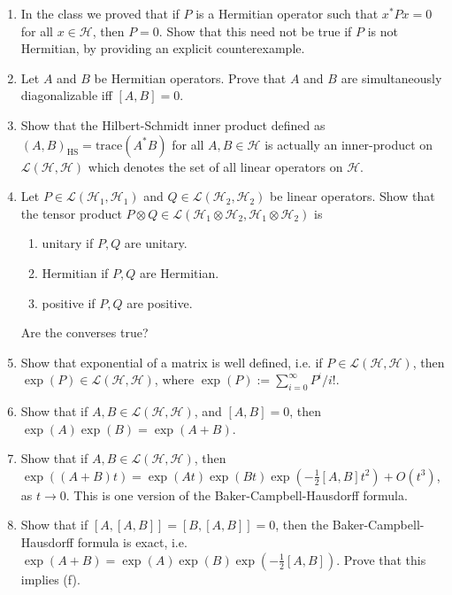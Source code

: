 \documentclass[10pt]{article}
\newcounter{ex}
\theoremstyle{plain}
\theoremstyle{definition}
\begin{document}
\begin{enumerate}[label=(\alph*)]

\item In the class we proved that if $P$ is a Hermitian operator such that $x^{\ast} P x = 0$ for all $x \in \mathcal{H}$, then $P = 0$. Show that this need not be true if $P$ is not Hermitian, by providing an explicit counterexample.

\item Let $A$ and $B$ be Hermitian operators. Prove that $A$ and $B$ are simultaneously diagonalizable iff $[A,B] = 0$.

\item Show that the Hilbert-Schmidt inner product defined as $(A,B)_{\text{HS}} = \text{trace}(A^{\ast}B)$ for all $A,B \in \mathcal{H}$ is actually an inner-product on $\mathcal{L}(\mathcal{H}, \mathcal{H})$ which denotes the set of all linear operators on $\mathcal{H}$.

\item Let $P \in \mathcal{L}(\mathcal{H}_1, \mathcal{H}_1)$ and $Q \in \mathcal{L}(\mathcal{H}_2, \mathcal{H}_2)$ be linear operators. Show that the tensor product $P \otimes Q \in \mathcal{L}(\mathcal{H}_1 \otimes \mathcal{H}_2, \mathcal{H}_1 \otimes \mathcal{H}_2)$ is
\begin{enumerate}[label=(\roman*)]
\item unitary if $P,Q$ are unitary.
\item Hermitian if $P,Q$ are Hermitian.
\item positive if $P,Q$ are positive.
\end{enumerate}
Are the converses true?

\item Show that exponential of a matrix is well defined, i.e. if $P \in \mathcal{L}(\mathcal{H}, \mathcal{H})$, then $\exp(P) \in \mathcal{L}(\mathcal{H}, \mathcal{H})$, where $\exp(P) := \sum\limits_{i=0}^{\infty} P^i / i !$.

\item Show that if $A,B \in \mathcal{L}(\mathcal{H}, \mathcal{H})$, and $[A,B] = 0$, then $\exp(A) \exp(B) = \exp(A+B)$.

\item Show that if $A,B \in \mathcal{L}(\mathcal{H}, \mathcal{H})$, then $\exp((A+B)t) = \exp(At) \exp(Bt) \exp(-\frac{1}{2}[A,B]t^2) + O(t^3)$, as $t \rightarrow 0$. This is one version of the Baker-Campbell-Hausdorff formula.

\item Show that if $[A,[A,B]] = [B,[A,B]] = 0$, then the Baker-Campbell-Hausdorff formula is exact, i.e.  $\exp(A+B) = \exp(A) \exp(B) \exp(-\frac{1}{2}[A,B])$. Prove that this implies (f).
\end{enumerate}
\end{document}

